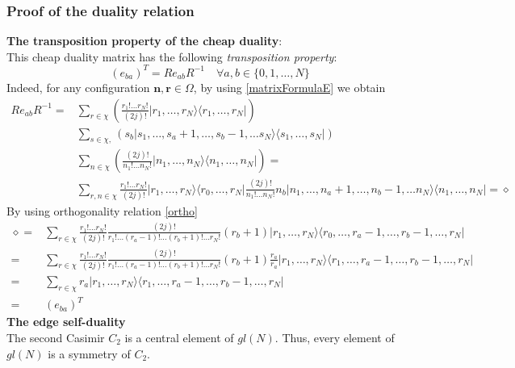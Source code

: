 \documentclass[11pt]{article}
\numberwithin{equation}{subsection}
\begin{document}
\subsubsection{Proof of the duality relation}
\textbf{The transposition property of the cheap duality}: \\
This cheap duality matrix has the following \textit{transposition property}:
\begin{equation}\label{transpositionR}
	\left(e_{ba}\right)^{T}=R e_{ab}R^{-1}\quad \forall a,b\in\{0,1,\ldots,N\}
\end{equation}
Indeed, for any configuration $\mathbf{n},\mathbf{r}\in \Omega$, by using \eqref{matrixFormulaE} we obtain
\begin{align*}
	R e_{ab}R^{-1}=&\sum_{r\in\chi}\left(\frac{r_{1}!\ldots r_{N}!}{(2j)!}|r_{1},\ldots,r_{N}\rangle \langle r_{1},\ldots, r_{N}|\right)
	\\&
	\sum_{s\in \chi,}\left(s_{b}|s_{1},\ldots,s_{a}+1,\ldots,s_{b}-1,\ldots s_{N}\rangle \langle s_{1},\ldots,s_{N}|\right)
	\\&
	\sum_{n\in\chi}\left(\frac{(2j)!}{n_{1}!\ldots n_{N}!}|n_{1},\ldots,n_{N}\rangle \langle n_{1},\ldots, n_{N}|\right)=
	\\&
	\sum_{r,n\in \chi}\frac{r_{1}!\ldots r_{N}!}{(2j)!}|r_{1},\ldots,r_{N}\rangle \langle r_{0},\ldots, r_{N}|
	\frac{(2j)!}{n_{1}!\ldots n_{N}!}n_{b}|n_{1},\ldots,n_{a}+1,\ldots,n_{b}-1,\ldots n_{N}\rangle \langle n_{1},\ldots,n_{N}|=\diamond
\end{align*}
By using orthogonality relation \eqref{ortho}\begin{align*}
\diamond=&\sum_{r\in \chi}\frac{r_{1}!\ldots r_{N}!}{(2j)!}\frac{(2j)!}{r_{1}!\ldots (r_{a}-1)!\ldots(r_{b}+1)!\ldots r_{N}!}(r_{b}+1)|r_{1},\ldots,r_{N}\rangle \langle r_{0},\ldots,r_{a}-1,\ldots,r_{b}-1,\ldots,r_{N}|
	\\=&\sum_{r\in\chi}\frac{r_{1}!\ldots r_{N}!}{(2j)!}\frac{(2j)!}{r_{1}!\ldots (r_{a}-1)!\ldots(r_{b}+1)!\ldots r_{N}!}(r_{b}+1)\frac{r_{a}}{r_{a}}|r_{1},\ldots,r_{N}\rangle \langle r_{1},\ldots,r_{a}-1,\ldots,r_{b}-1,\ldots,r_{N}|
	\\=&\sum_{r\in \chi}
	r_{a}|r_{1},\ldots,r_{N}\rangle \langle r_{1},\ldots,r_{a}-1,\ldots,r_{b}-1,\ldots,r_{N}|
	\\=&
	\left(e_{ba}\right)^{T}
\end{align*}
\textbf{The edge self-duality}\\
The second Casimir $C_{2}$ is a central element of $gl(N)$. Thus, every element of $gl(N)$ is a symmetry of $C_{2}$.
\end{document}
